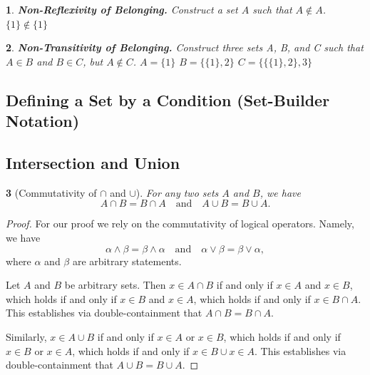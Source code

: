 \documentclass{book}
\newtheorem{majorEx}{}[section]
\begin{document}
            \begin{majorEx}%
            \textbf{\textit{Non-Reflexivity of Belonging.}} Construct a set $A$ such that $A \not\in A$.
            \newline $\{1\} \not\in \{1\}$
            \end{majorEx}
            
            \begin{majorEx}%
            \textbf{\textit{Non-Transitivity of Belonging.}} Construct three sets A, B, and C such that $A \in B$ and $B \in C$, but $A \not \in C$.
            \newline $A = \{1\}$
            \newline $B = \{\{1\}, 2\}$
            \newline $C = \{\{\{1\}, 2\}, 3\}$
            \end{majorEx}
            
			\subsection{Defining a Set by a Condition (Set-Builder Notation)}%
            
            
			\subsection{Intersection and Union}%
            
            \begin{majorEx} %
            [Commutativity of $\cap$ and $\cup$]
            For any two sets $A$ and $B$, we have
            \[
            A \cap B = B \cap A \quad \text{and} \quad
            A \cup B = B \cup A.
            \]
            \end{majorEx}
            \begin{proof}
            For our proof we rely on the commutativity of logical operators. Namely, we have
            \[
            \alpha \land \beta = \beta \land \alpha \quad \text{and} \quad
            \alpha \lor \beta = \beta \lor \alpha, 
            \]
            where $\alpha$ and $\beta$ are arbitrary statements.
            
            Let $A$ and $B$ be arbitrary sets. Then $x \in A \cap B$ if and only if $x \in A$ and $x \in B$, which holds if and only if $x \in B$ and $x \in A$, which holds if and only if $x \in B \cap A$. This establishes via double-containment that $A \cap B = B \cap A$.
            
            Similarly, $x \in A \cup B$ if and only if $x \in A$ or $x \in B$, which holds if and only if $x \in B$ or $x \in A$, which holds if and only if $x \in B \cup x \in A$. This establishes via double-containment that $A \cup B = B \cup A$.
            \end{proof}
            
\end{document}
